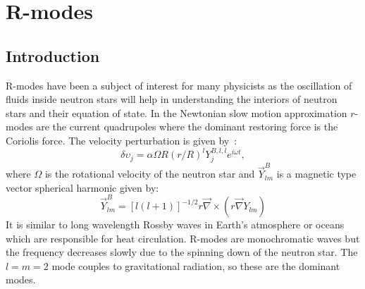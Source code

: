 \documentclass{ttuthes2007}
\begin{document}
\chapter{\textbf{R-modes}}

\section{Introduction}
R-modes have been a subject of interest for many physicists as the oscillation
of fluids inside neutron stars will help in understanding the interiors of
neutron stars and their equation of state. In the Newtonian slow motion
approximation $r$-modes are the current quadrupoles where the dominant restoring
force is the Coriolis force. The velocity perturbation is given
by~\cite{Owen:1998xg}:
\begin{equation}
\delta{\upsilon_j}=\alpha\Omega R(r/R)^ l Y_j^{B,l,l}e^{i \omega t},
\end{equation}
where $\Omega$ is the rotational velocity of the neutron star and $\vec{Y}_{lm}^B$ is a magnetic type vector spherical harmonic given by:
\begin{equation}
\vec{Y}_{lm}^B=[l(l+1)]^{-1/2} r \vec{\nabla} \times (r \vec{\nabla}Y_{lm})
\end{equation}
It is similar to long wavelength Rossby waves in Earth's atmosphere or oceans
which are responsible for heat circulation. R-modes are monochromatic waves but
the frequency decreases slowly due to the spinning down of the neutron star. The
$l=m=2$ mode couples to gravitational radiation, so these are the dominant
modes.
\end{document}
